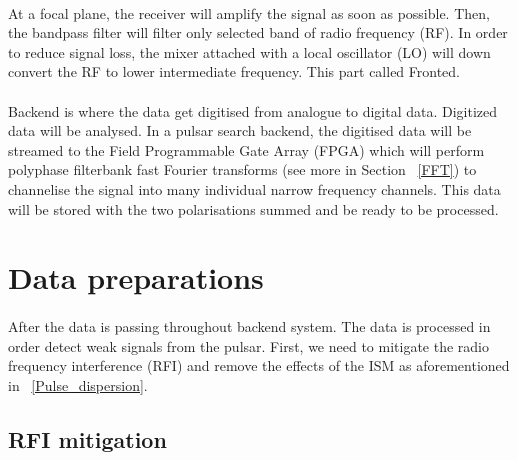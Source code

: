 \documentclass[thesis_msc.tex]{subfiles}
\begin{document}
        \paragraph{} At a focal plane, the receiver will amplify the signal as soon as possible. Then, the bandpass filter will filter only selected band of radio frequency (RF). In order to reduce signal loss, the mixer attached with a local oscillator (LO) will down convert the RF to lower intermediate frequency. This part called Fronted. 
		\paragraph{} Backend is where the data get digitised from analogue to digital data. Digitized data will be analysed. %
		In a pulsar search backend, the digitised data will be streamed to the Field Programmable Gate Array (FPGA) which will perform polyphase filterbank fast Fourier transforms (see more in Section ~\ref{FFT}) to channelise the signal into many individual narrow frequency channels. This data will be stored with the two polarisations summed and be ready to be processed.  
            \section{Data preparations} 
            \paragraph{} After the data is passing throughout backend system. The data is processed in order detect weak signals from the pulsar. First, we need to mitigate the radio frequency interference (RFI) and remove the effects of the ISM as aforementioned in  ~\ref{Pulse_dispersion}.    
            
   \subsection{RFI mitigation} \label{RFI_mit}
\end{document}
